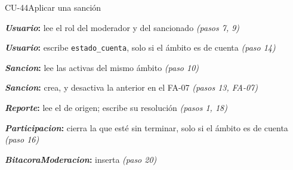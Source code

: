 \begin{fichacu}{CU-44}{Aplicar una sanción}
{\begin{cudatos}
      \item \textbf{\textit{Usuario}:} lee el rol del moderador y del sancionado \textit{(pasos 7, 9)}
      \item \textbf{\textit{Usuario}:} escribe \texttt{estado\_\allowbreak{}cuenta}, solo si el ámbito es de cuenta \textit{(paso 14)}
      \item \textbf{\textit{Sancion}:} lee las activas del mismo ámbito \textit{(paso 10)}
      \item \textbf{\textit{Sancion}:} crea, y desactiva la anterior en el \mbox{FA-07} \textit{(pasos 13, \mbox{FA-07})}
      \item \textbf{\textit{Reporte}:} lee el de origen; escribe su resolución \textit{(pasos 1, 18)}
      \item \textbf{\textit{Participacion}:} cierra la que esté sin terminar, solo si el ámbito es de cuenta \textit{(paso 16)}
      \item \textbf{\textit{BitacoraModeracion}:} inserta \textit{(paso 20)}
    \end{cudatos}} \\ \hline
\end{fichacu}
\clearpage
